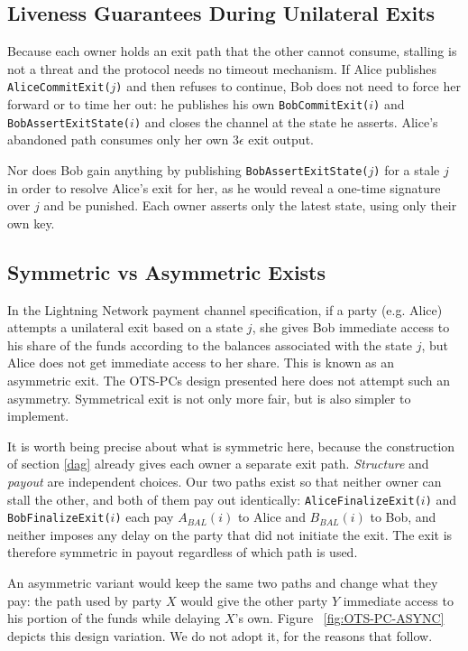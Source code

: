\documentclass[11pt,a4paper]{article}
\newcommand{\txname}[1]{\texttt{#1}}
\begin{document}
\subsection{Liveness Guarantees During Unilateral Exits}

Because each owner holds an exit path that the other cannot consume, stalling is not a threat and the protocol needs no timeout mechanism. If Alice publishes \txname{AliceCommitExit($j$)} and then refuses to continue, Bob does not need to force her forward or to time her out: he publishes his own \txname{BobCommitExit($i$)} and \txname{BobAssertExitState($i$)} and closes the channel at the state he asserts. Alice's abandoned path consumes only her own $3\epsilon$ exit output.

Nor does Bob gain anything by publishing \txname{BobAssertExitState($j$)} for a stale $j$ in order to resolve Alice's exit for her, as he would reveal a one-time signature over $j$ and be punished. Each owner asserts only the latest state, using only their own key.

\subsection{Symmetric vs Asymmetric Exists}

In the Lightning Network payment channel specification, if a party  (e.g. Alice) attempts a unilateral exit based on a state $j$, she gives Bob immediate access to his share of the funds according to the balances associated with the state $j$, but Alice does not get immediate access to her share. This is known as an asymmetric exit. The OTS-PCs design presented here does not attempt such an asymmetry. Symmetrical exit is not only more fair, but is also simpler to implement. 

It is worth being precise about what is symmetric here, because the construction of section \ref{dag} already gives each owner a separate exit path. \emph{Structure} and \emph{payout} are independent choices. Our two paths exist so that neither owner can stall the other, and both of them pay out identically: \txname{AliceFinalizeExit($i$)} and \txname{BobFinalizeExit($i$)} each pay $A_{BAL}(i)$ to Alice and $B_{BAL}(i)$ to Bob, and neither imposes any delay on the party that did not initiate the exit. The exit is therefore symmetric in payout regardless of which path is used.

An asymmetric variant would keep the same two paths and change what they pay: the path used by party $X$ would give the other party $Y$ immediate access to his portion of the funds while delaying $X$'s own. Figure ~\ref{fig:OTS-PC-ASYNC} depicts this design variation. We do not adopt it, for the reasons that follow.
\end{document}
